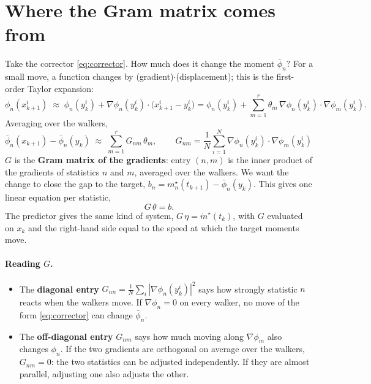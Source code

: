 \documentclass[11pt,a4paper]{article}
\begin{document}
\section{Where the Gram matrix comes from}\label{sec:where}

Take the corrector \eqref{eq:corrector}. How much does it change the moment $\bar\phi_n$?
For a small move, a function changes by (gradient)$\cdot$(displacement); this is the
first-order Taylor expansion:
\[
  \phi_n(x_{k+1}^i)\;\approx\;\phi_n(y_k^i)+\nabla\phi_n(y_k^i)\cdot\big(x_{k+1}^i-y_k^i\big)
  =\phi_n(y_k^i)+\sum_{m=1}^r\theta_m\,\nabla\phi_n(y_k^i)\cdot\nabla\phi_m(y_k^i).
\]
Averaging over the walkers,
\[
  \bar\phi_n(x_{k+1})-\bar\phi_n(y_k)\;\approx\;\sum_{m=1}^r G_{nm}\,\theta_m,
  \qquad
  \boxed{\,G_{nm}=\frac1N\sum_{i=1}^N\nabla\phi_n(y_k^i)\cdot\nabla\phi_m(y_k^i)\,}
\]
$G$ is the \textbf{Gram matrix of the gradients}: entry $(n,m)$ is the inner product of the
gradients of statistics $n$ and $m$, averaged over the walkers. We want the change to close
the gap to the target, $b_n=m^\star_n(t_{k+1})-\bar\phi_n(y_k)$. This gives one linear equation
per statistic,
\begin{equation}
  G\,\theta=b .
  \label{eq:system}
\end{equation}
The predictor gives the same kind of system, $G\,\eta=\dot m^\star(t_k)$, with $G$ evaluated on
$x_k$ and the right-hand side equal to the speed at which the target moments move.

\paragraph{Reading $G$.}
\begin{itemize}
  \item The \textbf{diagonal entry} $G_{nn}=\frac1N\sum_i|\nabla\phi_n(y_k^i)|^2$ says how strongly
    statistic $n$ reacts when the walkers move. If $\nabla\phi_n=0$ on every walker, no move of
    the form \eqref{eq:corrector} can change $\bar\phi_n$.
  \item The \textbf{off-diagonal entry} $G_{nm}$ says how much moving along $\nabla\phi_m$ also changes
    $\phi_n$. If the two gradients are orthogonal on average over the walkers, $G_{nm}=0$: the two
    statistics can be adjusted independently. If they are almost parallel, adjusting one also
    adjusts the other.
\end{itemize}

\end{document}
